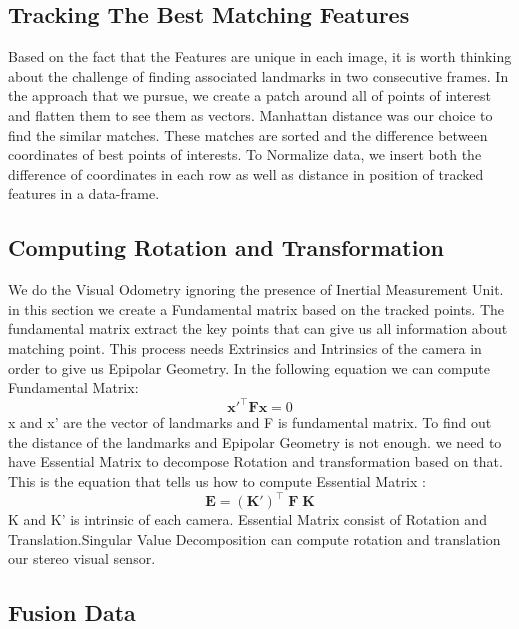 \documentclass[a4paper,twoside]{article}
\begin{document}
 
 
 
 
 \subsection{Tracking The Best Matching Features}
 
 Based on the fact that the Features are unique in each image, it is worth thinking about the challenge of finding associated landmarks  in two consecutive frames. In the approach that we pursue, we create a patch around all of points of interest and flatten them to see them as  vectors. Manhattan distance was our choice to find the similar matches. These matches are sorted and the difference between coordinates of best points of interests. 
 To Normalize data, we insert both the difference of coordinates in each row as well as distance in position of tracked features in a data-frame.
 \subsection{Computing Rotation and Transformation }
 We do the Visual Odometry ignoring the presence of Inertial Measurement Unit. in this section we create a Fundamental matrix \cite{luong1996fundamental} based on the tracked points. 
 The fundamental matrix extract the key points that can give us all information about matching point. This process needs Extrinsics and Intrinsics of the camera in order to give us Epipolar Geometry.\cite{hartley2003multiple} 
 In the following equation we can compute Fundamental Matrix:
 \begin{equation}\label{eq1}
 {\mathbf  {x}}'^{{\top }}{\mathbf  {Fx}}=0
 \end{equation} 
 x and x' are the vector of landmarks and F is fundamental matrix. 
 To find out the distance of the landmarks and Epipolar Geometry is not enough. we need to have Essential Matrix to decompose Rotation and transformation based on that. This is the equation that tells us how to compute Essential Matrix\cite{nister2004efficient} :
  \begin{equation}\label{eq2}
  {\displaystyle \mathbf {E} =({\mathbf {K} '})^{\top }\;\mathbf {F} \;\mathbf {K} }
  \end{equation}
  K and K' is intrinsic of each camera. 
  Essential Matrix consist of Rotation and Translation.Singular Value Decomposition can compute rotation and translation our stereo visual sensor. 
  
 
 \subsection{Fusion Data}
 
\end{document}
